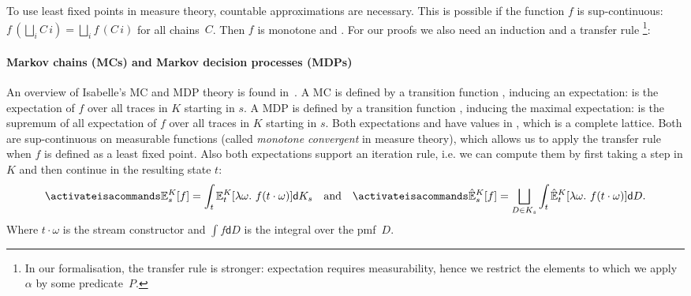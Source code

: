 \documentclass[a4paper]{llncs}
\begin{document}
To use least fixed points in measure theory, countable approximations are necessary.
This is possible if the function $f$ is sup-continuous: $f\,(\bigsqcup_i C\,i) = \bigsqcup_i f\,(C\,i)$ for all chains~$C$.
Then $f$ is monotone and .
For our proofs we also need an induction and a transfer rule%
\footnote{In our formalisation, the transfer rule is stronger: expectation requires measurability, hence we restrict the elements to which we apply $\alpha$ by some predicate~$P$.}:
%

\paragraph{Markov chains (MCs) and Markov decision processes (MDPs)}
An overview of Isabelle's MC and MDP theory is found in~\cite{hoelzl2016mdp, hoelzl2013thesis}.
A MC is defined by a transition function , inducing an expectation:  is the expectation of $f$ over all traces in $K$ starting in $s$.
A MDP is defined by a transition function , inducing the maximal expectation:  is the supremum of all expectation of $f$ over all traces in $K$ starting in $s$.
Both expectations  and  have values in , which is a complete lattice.
Both are sup-continuous on measurable functions (called \emph{monotone convergent} in measure theory), which allows us to apply the transfer rule when $f$ is defined as a least fixed point.
Also both expectations support an iteration rule, i.e. we can compute them by first taking a step in $K$ and then continue in the resulting state $t$:
%
\[ \isa{\mathbb{E}^K_s[f] = \int_t \mathbb{E}^K_t[\lambda \omega.~f(t\cdot\omega)] \mathsf{d}K_s} \quad \textrm{and} \quad
\isa{\hat{\mathbb{E}}^K_s[f] = \bigsqcup_{D \in K_s} \int_t \hat{\mathbb{E}}^K_t[\lambda \omega.~f(t\cdot\omega)] \mathsf{d}D}. \]
%
Where $t\cdot\omega$ is the stream constructor and $\int f\mathsf{d}D$ is the integral over the pmf~$D$.
\end{document}
